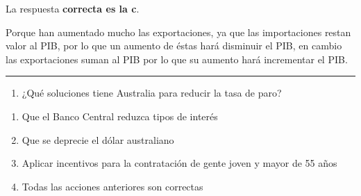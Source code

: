 \documentclass[
  letterpaper,
  DIV=11,
  numbers=noendperiod]{scrreprt}
\providecommand{\tightlist}{%
  \setlength{\itemsep}{0pt}\setlength{\parskip}{0pt}}\usepackage{longtable,booktabs,array}
\begin{document}
\begin{tcolorbox}[enhanced jigsaw, left=2mm, opacityback=0, colback=white, breakable, arc=.35mm, bottomrule=.15mm, rightrule=.15mm, toprule=.15mm, leftrule=.75mm, colframe=quarto-callout-tip-color-frame]
\begin{minipage}[t]{5.5mm}
\textcolor{quarto-callout-tip-color}{\faLightbulb}
\end{minipage}%
\begin{minipage}[t]{\textwidth - 5.5mm}

La respuesta \textbf{correcta es la c}.

Porque han aumentado mucho las exportaciones, ya que las importaciones
restan valor al PIB, por lo que un aumento de éstas hará disminuir el
PIB, en cambio las exportaciones suman al PIB por lo que su aumento hará
incrementar el PIB.

\end{minipage}%
\end{tcolorbox}

\begin{center}\rule{0.5\linewidth}{0.5pt}\end{center}

\begin{enumerate}
\def\labelenumi{\arabic{enumi}.}
\setcounter{enumi}{4}
\tightlist
\item
  ¿Qué soluciones tiene Australia para reducir la tasa de paro?
\end{enumerate}

\begin{enumerate}
\def\labelenumi{\alph{enumi})}
\item
  Que el Banco Central reduzca tipos de interés
\item
  Que se deprecie el dólar australiano
\item
  Aplicar incentivos para la contratación de gente joven y mayor de 55
  años
\item
  Todas las acciones anteriores son correctas
\end{enumerate}
\end{document}
